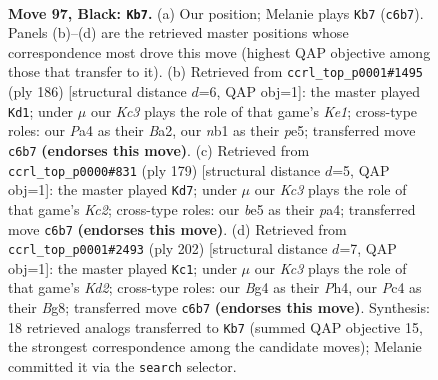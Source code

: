 \documentclass[11pt]{article}
\begin{document}
\clearpage

\begin{figure}[p]\centering
\begin{subfigure}{0.46\textwidth}\centering
\resizebox{\linewidth}{!}{%
\newchessgame
\chessboard[
  setfen={8/8/2k5/4B3/p1p3b1/8/5K2/1N6 b - - 49 97},
  showmover=false,
  pgfstyle=straightmove, color=movearrow, markmove={c6-b7}
]}
\caption{}
\end{subfigure}\hfill
\begin{subfigure}{0.46\textwidth}\centering
\resizebox{\linewidth}{!}{%
\newchessgame
\chessboard[
  setfen={3k4/8/8/4p3/8/4bP2/B7/4K3 w - - 9 94},
  showmover=false,
  pgfstyle=straightmove, color=movearrow, markmove={e1-d1}
]}
\caption{}
\end{subfigure}
\\[4pt]
\begin{subfigure}{0.46\textwidth}\centering
\resizebox{\linewidth}{!}{%
\newchessgame
\chessboard[
  setfen={8/2k5/8/p2K4/P7/3N4/4p3/8 b - - 47 90},
  showmover=false,
  pgfstyle=straightmove, color=movearrow, markmove={c7-d7}
]}
\caption{}
\end{subfigure}\hfill
\begin{subfigure}{0.46\textwidth}\centering
\resizebox{\linewidth}{!}{%
\newchessgame
\chessboard[
  setfen={6B1/8/8/7b/5k1P/8/3K4/8 w - - 7 102},
  showmover=false,
  pgfstyle=straightmove, color=movearrow, markmove={d2-c1}
]}
\caption{}
\end{subfigure}
\caption{\textbf{Move 97, Black: \texttt{Kb7}.} (a) Our position; Melanie plays \texttt{Kb7} (\texttt{c6b7}). Panels (b)--(d) are the retrieved master positions whose correspondence most drove this move (highest QAP objective among those that transfer to it). (b) Retrieved from \texttt{ccrl\_top\_p0001\#1495} (ply 186) [structural distance $d$=6, QAP obj=1]: the master played \texttt{Kd1}; under $\mu$ our \emph{Kc3} plays the role of that game's \emph{Ke1}; cross-type roles: our \emph{P}a4 as their \emph{B}a2, our \emph{n}b1 as their \emph{p}e5; transferred move \texttt{c6b7} \textbf{(endorses this move)}. (c) Retrieved from \texttt{ccrl\_top\_p0000\#831} (ply 179) [structural distance $d$=5, QAP obj=1]: the master played \texttt{Kd7}; under $\mu$ our \emph{Kc3} plays the role of that game's \emph{Kc2}; cross-type roles: our \emph{b}e5 as their \emph{p}a4; transferred move \texttt{c6b7} \textbf{(endorses this move)}. (d) Retrieved from \texttt{ccrl\_top\_p0001\#2493} (ply 202) [structural distance $d$=7, QAP obj=1]: the master played \texttt{Kc1}; under $\mu$ our \emph{Kc3} plays the role of that game's \emph{Kd2}; cross-type roles: our \emph{B}g4 as their \emph{P}h4, our \emph{P}c4 as their \emph{B}g8; transferred move \texttt{c6b7} \textbf{(endorses this move)}. Synthesis: 18 retrieved analogs transferred to \texttt{Kb7} (summed QAP objective 15, the strongest correspondence among the candidate moves); Melanie committed it via the \texttt{search} selector.}
\label{fig:thought-m193}
\end{figure}
\end{document}
